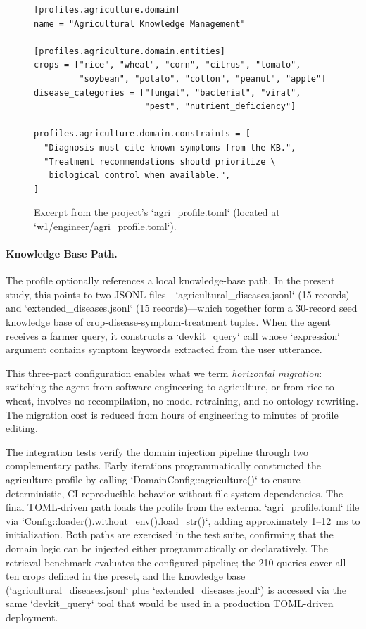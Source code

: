\documentclass[11pt,a4paper]{article}
\begin{document}
\begin{figure}[htbp]
\centering
\begin{minipage}{0.85\linewidth}
\begin{verbatim}
[profiles.agriculture.domain]
name = "Agricultural Knowledge Management"

[profiles.agriculture.domain.entities]
crops = ["rice", "wheat", "corn", "citrus", "tomato",
         "soybean", "potato", "cotton", "peanut", "apple"]
disease_categories = ["fungal", "bacterial", "viral",
                      "pest", "nutrient_deficiency"]

profiles.agriculture.domain.constraints = [
  "Diagnosis must cite known symptoms from the KB.",
  "Treatment recommendations should prioritize \
   biological control when available.",
]
\end{verbatim}
\end{minipage}
\caption{Excerpt from the project's `agri\_profile.toml` (located at `w1/engineer/agri\_profile.toml`).}
\label{lst:profile}
\end{figure}

\paragraph{Knowledge Base Path.} The profile optionally references a local knowledge-base path. In the present study, this points to two JSONL files---`agricultural\_diseases.jsonl` (15 records) and `extended\_diseases.jsonl` (15 records)---which together form a 30-record seed knowledge base of crop-disease-symptom-treatment tuples. When the agent receives a farmer query, it constructs a `devkit\_query` call whose `expression` argument contains symptom keywords extracted from the user utterance.

This three-part configuration enables what we term \textit{horizontal migration}: switching the agent from software engineering to agriculture, or from rice to wheat, involves no recompilation, no model retraining, and no ontology rewriting. The migration cost is reduced from hours of engineering to minutes of profile editing.

The integration tests verify the domain injection pipeline through two complementary paths. Early iterations programmatically constructed the agriculture profile by calling `DomainConfig::agriculture()` to ensure deterministic, CI-reproducible behavior without file-system dependencies. The final TOML-driven path loads the profile from the external `agri\_profile.toml` file via `Config::loader().without\_env().load\_str()`, adding approximately 1--12~ms to initialization. Both paths are exercised in the test suite, confirming that the domain logic can be injected either programmatically or declaratively. The retrieval benchmark evaluates the configured pipeline; the 210 queries cover all ten crops defined in the preset, and the knowledge base (`agricultural\_diseases.jsonl` plus `extended\_diseases.jsonl`) is accessed via the same `devkit\_query` tool that would be used in a production TOML-driven deployment.
\end{document}
